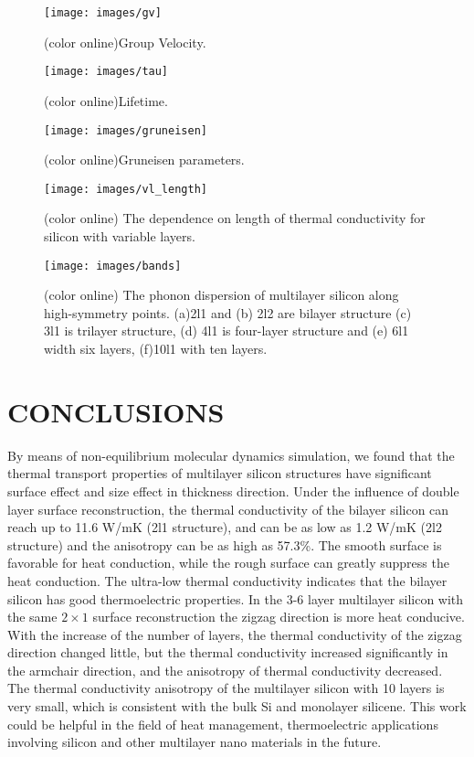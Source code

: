 \documentclass[%
 reprint,
 amsmath,amssymb,
 aps,
prb,
]{revtex4-1}
\begin{document}
\begin{figure}[b]
\texttt{[image: images/gv]}
\caption{\label{fig:gv} (color online)Group Velocity.}
\end{figure}

\begin{figure}[b]
\texttt{[image: images/tau]}
\caption{\label{fig:tau} (color online)Lifetime.}
\end{figure}

\begin{figure}[b]
\texttt{[image: images/gruneisen]}
\caption{\label{fig:gruneisen} (color online)Gruneisen parameters.}
\end{figure}

\begin{figure}[b]
\texttt{[image: images/vl\_length]}
\caption{\label{fig:vl_length}(color online) The dependence on length of thermal conductivity for silicon with variable layers.}
\end{figure}

\begin{figure}[b]
\texttt{[image: images/bands]}
\caption{\label{fig:bands}(color online) The phonon dispersion of multilayer silicon along high-symmetry points. (a)2l1 and (b) 2l2 are bilayer structure (c) 3l1 is trilayer structure, (d) 4l1 is four-layer structure and (e) 6l1 width six layers, (f)10l1 with ten layers.}
\end{figure}

\section{CONCLUSIONS}

By means of non-equilibrium molecular dynamics simulation, we found that the thermal transport properties of multilayer silicon structures have significant surface effect and size effect in thickness direction. Under the influence of double layer surface reconstruction, the thermal conductivity of the bilayer silicon can reach up to 11.6 W/mK (2l1 structure), and can be as low as 1.2 W/mK (2l2 structure) and the anisotropy can be as high as 57.3\%. The smooth surface is favorable for heat conduction, while the rough surface can greatly suppress the heat conduction. The ultra-low thermal conductivity indicates that the bilayer silicon has good thermoelectric properties. In the 3-6 layer multilayer silicon with the same $2 \times 1$ surface reconstruction the zigzag direction is more heat conducive. With the increase of the number of layers, the thermal conductivity of the zigzag direction changed little, but the thermal conductivity increased significantly in the armchair direction, and the anisotropy of thermal conductivity decreased. The thermal conductivity anisotropy of the multilayer silicon with 10 layers is very small, which is consistent with the bulk Si and monolayer silicene. This work could be helpful in the field of heat management, thermoelectric applications involving silicon and other multilayer nano materials in the future.
\end{document}
